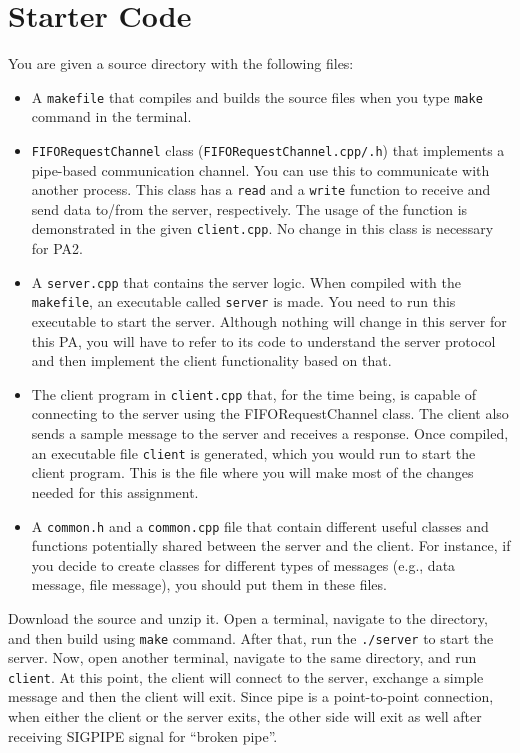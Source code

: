 \documentclass[12pt]{article}
\begin{document}
\section{Starter Code}
You are given a source directory with the following files:
\begin{itemize}
	\item A \texttt{makefile} that compiles and builds the source files when you type \texttt{make} command in the terminal.
	
	\item \texttt{FIFORequestChannel} class (\texttt{FIFORequestChannel.cpp/.h}) that implements a pipe-based communication channel. You can use this to communicate with another process. This class has a \texttt{read} and a \texttt{write} function to receive and send data to/from the server, respectively. The usage of the function is demonstrated in the given \texttt{client.cpp}. No change in this class is necessary for PA2.  

	\item A \texttt{server.cpp} that contains the server logic. When compiled with the \texttt{makefile}, an executable called \texttt{server} is made. You need to run this executable to start the server. Although nothing will change in this server for this PA, you will have to refer to its code to understand the server protocol and then implement the client functionality based on that. 
	
	\item The client program in \texttt{client.cpp} that, for the time being, is capable of connecting to the server using the FIFORequestChannel class. The client also sends a sample message to the server and receives a response. Once compiled, an executable file \texttt{client} is generated, which you would run to start the client program. This is the file where you will make most of the changes needed for this assignment.  
	
	\item A \texttt{common.h} and a \texttt{common.cpp} file that contain different useful classes and functions potentially shared between the server and the client. For instance, if you decide to create classes for different types of messages (e.g., data message, file message), you should put them in these files.
\end{itemize}
	
Download the source and unzip it. Open a terminal, navigate to the directory, and then build using \texttt{make} command. After that, run the \texttt{./server} to start the server. Now, open another terminal, navigate to the same directory, and run \texttt{client}. At this point, the client will connect to the server, exchange a simple message and then the client will exit. Since pipe is a point-to-point connection, when either the client or the server exits, the other side will exit as well after receiving SIGPIPE signal for ``broken pipe''.
	
\end{document}
